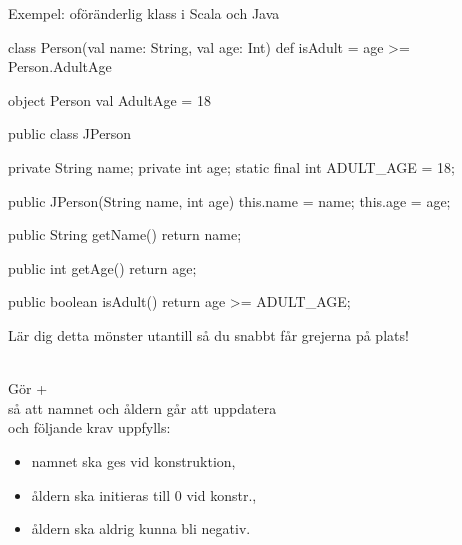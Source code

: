 \begin{Slide}{Exempel: oföränderlig klass i Scala och Java}\SlideFontTiny
\vspace{-1em}
\begin{multicols}{2}
\begin{CodeSmall}[basicstyle=\ttfamily\SlideFontSize{5.7}{6.7}]
class Person(val name: String, val age: Int){
  def isAdult = age >= Person.AdultAge
}

object Person {
  val AdultAge = 18
}
\end{CodeSmall}

\columnbreak

\pause
\begin{CodeSmall}[language=Java,basicstyle=\ttfamily\SlideFontSize{5.7}{6.7}]
public class JPerson {
    private String name;
    private int age;
    static final int ADULT_AGE = 18;

    public JPerson(String name, int age) {
      this.name = name;
      this.age = age;
    }

    public String getName() {
        return name;
    }

    public int getAge() {
        return age;
    }

    public boolean isAdult() {
        return age >= ADULT_AGE;
    }
}
\end{CodeSmall}
Lär dig detta mönster utantill så du snabbt får grejerna på plats!
\end{multicols}
\pause\vspace{-11em}
\\Gör  +  \\så att namnet och åldern går att uppdatera\\och följande krav uppfylls:
\begin{itemize}
\item namnet ska ges vid konstruktion,
\item åldern ska initieras till 0 vid konstr.,
\item åldern ska aldrig kunna bli negativ.
\end{itemize}
\end{Slide}


